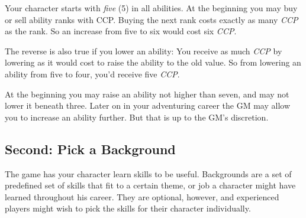 \documentclass[11pt,a4paper,openany]{scrbook}
\begin{document}
Your character starts with \emph{five} (5) in all abilities. At the beginning
you may buy or sell ability ranks with CCP. Buying the next rank costs exactly
as many \emph{CCP} as the rank. So an increase from five to six would cost six
\emph{CCP}.

The reverse is also true if you lower an ability: You receive as much \emph{CCP}
by lowering as it would cost to raise the ability to the old value. So from
lowering an ability from five to four, you'd receive five \emph{CCP}.

At the beginning you may raise an ability not higher than seven, and may not
lower it beneath three. Later on in your adventuring career the GM may allow you
to increase an ability further. But that is up to the GM's discretion.

\subsection{Second: Pick a Background}

The game has your character learn skills to be useful. Backgrounds are a set of
predefined set of skills that fit to a certain theme, or job a character might
have learned throughout his career. They are optional, however, and experienced
players might wish to pick the skills for their character individually.
\end{document}
